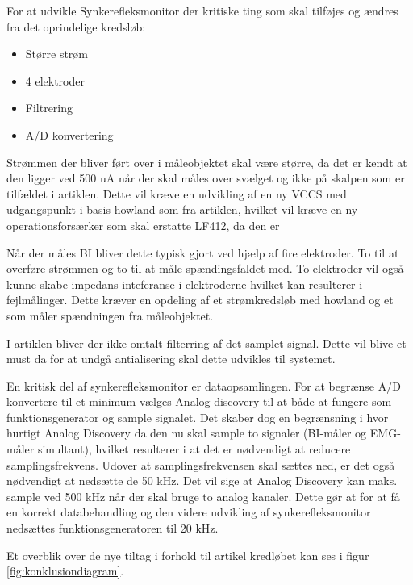 For at udvikle Synkerefleksmonitor der kritiske ting som skal tilføjes og ændres fra det oprindelige kredsløb:
\begin{itemize}
\item Større strøm
\item 4 elektroder
\item Filtrering
\item A/D konvertering
\end{itemize}

Strømmen der bliver ført over i måleobjektet skal være større, da det er kendt at den ligger ved 500 uA\cite{Kusuhara2004} når der skal måles over svælget og ikke på skalpen som er tilfældet i artiklen. Dette vil kræve en udvikling af en ny VCCS med udgangspunkt i basis howland som fra artiklen, hvilket vil kræve en ny operationsforsærker som skal erstatte LF412, da den er  

Når der måles BI bliver dette typisk gjort ved hjælp af fire elektroder\cite{Brantlov2017}. To til at overføre strømmen og to til at måle spændingsfaldet med. To elektroder vil også kunne skabe impedans inteferanse i elektroderne hvilket kan resulterer i fejlmålinger. Dette kræver en opdeling af et strømkredsløb med howland og et som måler spændningen fra måleobjektet.

I artiklen bliver der ikke omtalt filterring af det samplet signal. Dette vil blive et must da for at undgå antialisering\cite{Thomas2011} skal dette udvikles til systemet.


En kritisk del af synkerefleksmonitor er dataopsamlingen. For at begrænse A/D konvertere til et minimum vælges Analog discovery til at både at fungere som funktionsgenerator og sample signalet. Det skaber dog en begrænsning i hvor hurtigt Analog Discovery da den nu skal sample to signaler (BI-måler og EMG-måler simultant), hvilket resulterer i at det er nødvendigt at reducere samplingsfrekvens. Udover at samplingsfrekvensen skal sættes ned, er det også nødvendigt at nedsætte de 50 kHz. Det vil sige at Analog Discovery kan maks. sample ved 500 kHz når der skal bruge to analog kanaler. Dette gør at for at få en korrekt databehandling og den videre udvikling af synkerefleksmonitor nedsættes funktionsgeneratoren til 20 kHz.

Et overblik over de nye tiltag i forhold til artikel kredløbet kan ses i figur \ref{fig:konklusiondiagram}. 




